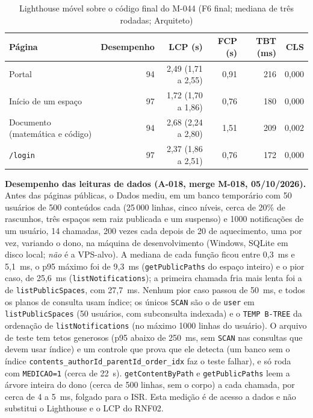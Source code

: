 \begin{table}[htbp]
\centering
\small
\caption{Lighthouse móvel sobre o código final do M-044 (F6 final; mediana de três rodadas; Arquiteto)}\label{tab:lighthouse-final}
\begin{tabular}{@{}lrrrrr@{}}
\toprule
\textbf{Página} & \textbf{Desempenho} & \textbf{LCP (s)} & \textbf{FCP (s)} & \textbf{TBT (ms)} & \textbf{CLS}\\
\midrule
Portal & 94 & 2,49 (1,71 a 2,55) & 0,91 & 216 & 0,000\\
Início de um espaço & 97 & 1,72 (1,70 a 1,86) & 0,76 & 180 & 0,000\\
Documento (matemática e código) & 94 & 2,68 (2,24 a 2,80) & 1,51 & 209 & 0,002\\
\texttt{/login} & 97 & 2,37 (1,86 a 2,51) & 0,76 & 172 & 0,000\\
\bottomrule
\end{tabular}
\end{table}

\textbf{Desempenho das leituras de dados (A-018, merge M-018, 05/10/2026).} Antes das páginas públicas, o Dados mediu, em um banco temporário com 50 usuários de 500 conteúdos cada (25\,000 linhas, cinco níveis, cerca de 20\% de rascunhos, três espaços sem raiz publicada e um suspenso) e 1000 notificações de um usuário, 14 chamadas, 200 vezes cada depois de 20 de aquecimento, uma por vez, variando o dono, na máquina de desenvolvimento (Windows, SQLite em disco local; \emph{não} é a VPS-alvo). A mediana de cada função ficou entre 0,3~ms e 5,1~ms, o p95 máximo foi de 9,3~ms (\texttt{getPublicPaths} do espaço inteiro) e o pior caso, de 25,6~ms (\texttt{listNotifications}); a primeira chamada fria mais lenta foi a de \texttt{listPublicSpaces}, com 27,7~ms. Nenhum pior caso passou de 50~ms, e todos os planos de consulta usam índice; os únicos \texttt{SCAN} são o de \texttt{user} em \texttt{listPublicSpaces} (50 usuários, com subconsulta indexada) e o \texttt{TEMP B-TREE} da ordenação de \texttt{listNotifications} (no máximo 1000 linhas do usuário). O arquivo de teste tem tetos generosos (p95 abaixo de 250~ms, sem \texttt{SCAN} nas consultas que devem usar índice) e um controle que prova que ele detecta (um banco sem o índice \texttt{contents\_authorId\_parentId\_order\_idx} faz o teste falhar), e só roda com \texttt{MEDICAO=1} (cerca de 22~s). \texttt{getContentByPath} e \texttt{getPublicPaths} leem a árvore inteira do dono (cerca de 500 linhas, sem o corpo) a cada chamada, por cerca de 4 a 5~ms, folgado para o ISR. Esta medição é de acesso a dados e não substitui o Lighthouse e o LCP do RNF02.

